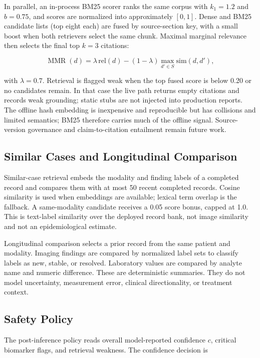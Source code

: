 \documentclass[conference]{IEEEtran}
\begin{document}
In parallel, an in-process BM25 scorer ranks the same corpus with \(k_1=1.2\) and \(b=0.75\), and scores are normalized into approximately \([0,1]\). Dense and BM25 candidate lists (top eight each) are fused by source-section key, with a small boost when both retrievers select the same chunk. Maximal marginal relevance then selects the final top \(k=3\) citations:

\begin{equation}
\operatorname{MMR}(d)=
\lambda\,\mathrm{rel}(d)-(1-\lambda)\max_{d'\in S}\mathrm{sim}(d,d'),
\end{equation}

with \(\lambda=0.7\). Retrieval is flagged weak when the top fused score is below 0.20 or no candidates remain. In that case the live path returns empty citations and records weak grounding; static stubs are not injected into production reports. The offline hash embedding is inexpensive and reproducible but has collisions and limited semantics; BM25 therefore carries much of the offline signal. Source-version governance and claim-to-citation entailment remain future work.

\subsection{Similar Cases and Longitudinal Comparison}

Similar-case retrieval embeds the modality and finding labels of a completed record and compares them with at most 50 recent completed records. Cosine similarity is used when embeddings are available; lexical term overlap is the fallback. A same-modality candidate receives a 0.05 score bonus, capped at 1.0. This is text-label similarity over the deployed record bank, not image similarity and not an epidemiological estimate.

Longitudinal comparison selects a prior record from the same patient and modality. Imaging findings are compared by normalized label sets to classify labels as new, stable, or resolved. Laboratory values are compared by analyte name and numeric difference. These are deterministic summaries. They do not model uncertainty, measurement error, clinical directionality, or treatment context.

\subsection{Safety Policy}

The post-inference policy reads overall model-reported confidence \(c\), critical biomarker flags, and retrieval weakness. The confidence decision is
\end{document}
